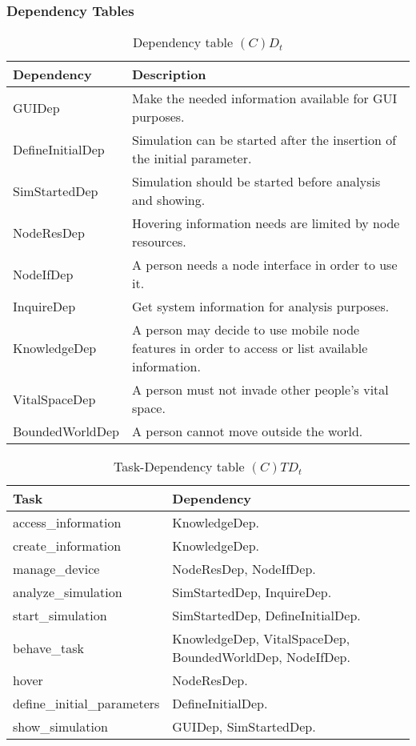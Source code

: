 \subsubsection{Dependency Tables}

\begin{table}[H]
	\centering
	\begin{tabular}{|p{4cm}|p{8cm}|}
			\hline
			\textbf{Dependency} & \textbf{Description} \\
			\hline
			GUIDep & Make the needed information available for GUI purposes. \\
			\hline
			DefineInitialDep & Simulation can be started after the insertion of the
			initial parameter. \\
			\hline
			SimStartedDep & Simulation should be started before analysis and showing. \\
			\hline
			NodeResDep & Hovering information needs are limited by node resources. \\
			\hline
			NodeIfDep & A person needs a node interface in order to use it. \\
			\hline
			InquireDep & Get system information for analysis purposes. \\
			\hline
			KnowledgeDep & A person may decide to use mobile node features in order
			to access or list available information. \\
			\hline
			VitalSpaceDep & A person must not invade other people's vital space. \\
			\hline
			BoundedWorldDep & A person cannot move outside the world. \\
			\hline
		\end{tabular}
	\caption{Dependency table $(C)D_t$}
	\label{tab:cdt}
\end{table}

\begin{table}[H]
	\centering
	\begin{tabular}{|p{5cm}|p{7cm}|}
			\hline
			\textbf{Task} & \textbf{Dependency} \\
			\hline
			access\_information & KnowledgeDep. \\
			\hline
			create\_information & KnowledgeDep. \\
			\hline
			manage\_device & NodeResDep, NodeIfDep. \\
			\hline
			analyze\_simulation & SimStartedDep, InquireDep. \\
			\hline
			start\_simulation & SimStartedDep, DefineInitialDep. \\
			\hline
			behave\_task & KnowledgeDep, VitalSpaceDep, BoundedWorldDep, NodeIfDep. \\
			\hline
			hover & NodeResDep. \\
			\hline
			define\_initial\_parameters & DefineInitialDep. \\
			\hline
			show\_simulation & GUIDep, SimStartedDep. \\
			\hline
		\end{tabular}
	\caption{Task-Dependency table $(C)TD_t$}
	\label{tab:ctdt}
\end{table}

